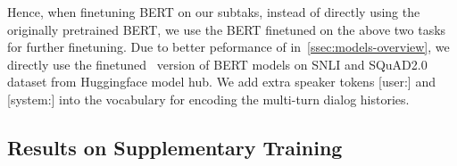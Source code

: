 Hence, when finetuning BERT on our subtaks, instead of directly using
the originally pretrained BERT, we use the BERT
finetuned on the above two tasks for further finetuning.  Due to better
peformance of \CE in~\autoref{ssec:models-overview}, we directly use the finetuned
\CE~version of BERT models on SNLI and SQuAD2.0 dataset from
Huggingface model hub. We add extra speaker tokens [user:] and
[system:] into the vocabulary for encoding the multi-turn dialog
histories.
%

\subsection{Results on Supplementary Training}
\label{ssec:sgd:results-secondary}

